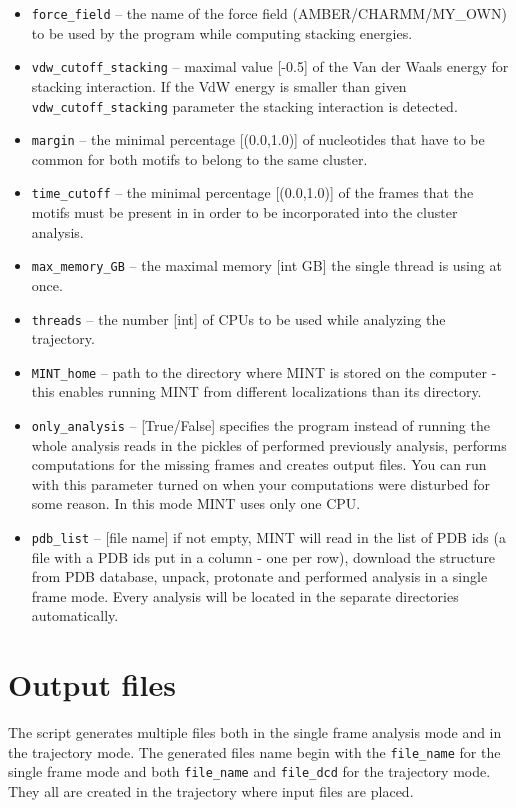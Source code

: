 \documentclass[12pt]{article}
\begin{document}
\begin{itemize}
\item \texttt{force\_field} --  the name of the force field (AMBER/CHARMM/MY\_OWN) to be used by the program while computing stacking energies.
\item \texttt{vdw\_cutoff\_stacking} -- maximal value [-0.5] of the Van der Waals energy for stacking interaction. If the VdW energy is smaller than given  \texttt{vdw\_cutoff\_stacking} parameter the stacking interaction is detected.
\item \texttt{margin} -- the minimal percentage [(0.0,1.0)] of nucleotides that have to be common for both motifs to belong to the same cluster.
\item \texttt{time\_cutoff} -- the minimal percentage [(0.0,1.0)] of the frames that the motifs must be present in in order to be incorporated into the cluster analysis. 
\item \texttt{max\_memory\_GB} -- the maximal memory [int GB] the single thread is using at once.
\item \texttt{threads} -- the number [int] of CPUs to be used while analyzing  the trajectory.
\item \texttt{MINT\_home} -- path to the directory where MINT is stored on the computer - this enables running MINT from different localizations than its directory.
\item \texttt{only\_analysis} -- [True/False] specifies the program instead of running the whole analysis reads in the pickles of performed previously analysis, performs computations for the missing frames and creates output files. You can run with this parameter turned on when your computations were disturbed for some reason. In this mode MINT uses only one CPU.
\item \texttt{pdb\_list} -- [file name] if not empty, MINT will read in the list of PDB ids (a file with a PDB ids put in a column - one per row), download the structure from PDB database, unpack, protonate and performed analysis in a single frame mode. Every analysis will be located in the separate directories automatically. 
\end{itemize}


\section{Output files}\label{OutputFiles}
The script generates multiple files both in the single frame analysis mode and in the trajectory mode. The generated files name begin with the \texttt{file\_name} for the single frame mode and both \texttt{file\_name} and \texttt{file\_dcd} for the trajectory mode. They all are created in the trajectory where input files are placed.
\end{document}
